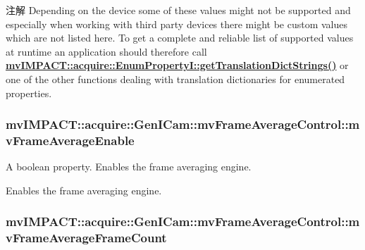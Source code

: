 \begin{DoxyNote}{注解}
Depending on the device some of these values might not be supported and especially when working with third party devices there might be custom values which are not listed here. To get a complete and reliable list of supported values at runtime an application should therefore call {\bfseries \hyperlink{classmv_i_m_p_a_c_t_1_1acquire_1_1_enum_property_i_a0ba6ccbf5ee69784d5d0b537924d26b6}{mv\+I\+M\+P\+A\+C\+T\+::acquire\+::\+Enum\+Property\+I\+::get\+Translation\+Dict\+Strings()}} or one of the other functions dealing with translation dictionaries for enumerated properties. 
\end{DoxyNote}
\hypertarget{classmv_i_m_p_a_c_t_1_1acquire_1_1_gen_i_cam_1_1mv_frame_average_control_ac1a35605c2a85004a22af0efc0c5161a}{
\subsubsection[{mv\+Frame\+Average\+Enable}]{ mv\+I\+M\+P\+A\+C\+T\+::acquire\+::\+Gen\+I\+Cam\+::mv\+Frame\+Average\+Control\+::mv\+Frame\+Average\+Enable}}\label{classmv_i_m_p_a_c_t_1_1acquire_1_1_gen_i_cam_1_1mv_frame_average_control_ac1a35605c2a85004a22af0efc0c5161a}


A boolean property. Enables the frame averaging engine. 

Enables the frame averaging engine. \hypertarget{classmv_i_m_p_a_c_t_1_1acquire_1_1_gen_i_cam_1_1mv_frame_average_control_a1dbf6189418f2413d66c53de4f99a91b}{
\subsubsection[{mv\+Frame\+Average\+Frame\+Count}]{ mv\+I\+M\+P\+A\+C\+T\+::acquire\+::\+Gen\+I\+Cam\+::mv\+Frame\+Average\+Control\+::mv\+Frame\+Average\+Frame\+Count}}\label{classmv_i_m_p_a_c_t_1_1acquire_1_1_gen_i_cam_1_1mv_frame_average_control_a1dbf6189418f2413d66c53de4f99a91b}


